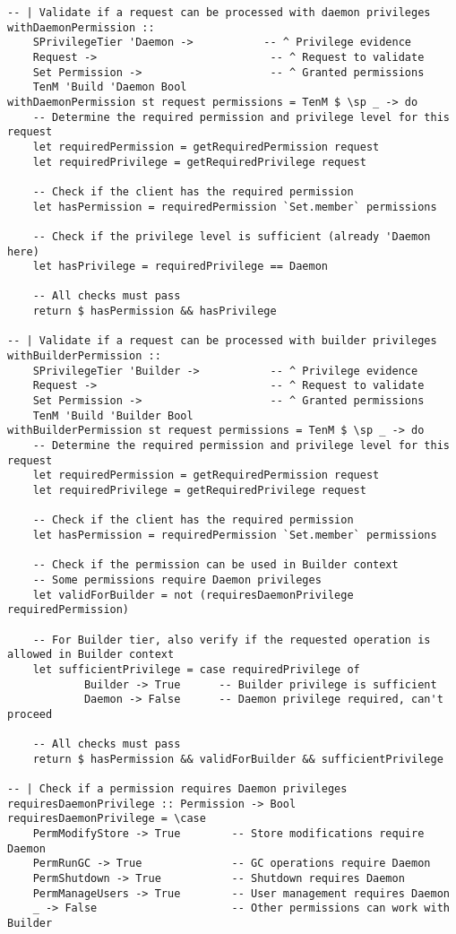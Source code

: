 \documentclass{article}
\begin{document}
\begin{tcolorbox}[title=Ten/Daemon/Server.hs Changes]
\begin{verbatim}
-- | Validate if a request can be processed with daemon privileges
withDaemonPermission ::
    SPrivilegeTier 'Daemon ->           -- ^ Privilege evidence
    Request ->                           -- ^ Request to validate
    Set Permission ->                    -- ^ Granted permissions
    TenM 'Build 'Daemon Bool
withDaemonPermission st request permissions = TenM $ \sp _ -> do
    -- Determine the required permission and privilege level for this request
    let requiredPermission = getRequiredPermission request
    let requiredPrivilege = getRequiredPrivilege request

    -- Check if the client has the required permission
    let hasPermission = requiredPermission `Set.member` permissions

    -- Check if the privilege level is sufficient (already 'Daemon here)
    let hasPrivilege = requiredPrivilege == Daemon

    -- All checks must pass
    return $ hasPermission && hasPrivilege

-- | Validate if a request can be processed with builder privileges
withBuilderPermission ::
    SPrivilegeTier 'Builder ->           -- ^ Privilege evidence
    Request ->                           -- ^ Request to validate
    Set Permission ->                    -- ^ Granted permissions
    TenM 'Build 'Builder Bool
withBuilderPermission st request permissions = TenM $ \sp _ -> do
    -- Determine the required permission and privilege level for this request
    let requiredPermission = getRequiredPermission request
    let requiredPrivilege = getRequiredPrivilege request

    -- Check if the client has the required permission
    let hasPermission = requiredPermission `Set.member` permissions

    -- Check if the permission can be used in Builder context
    -- Some permissions require Daemon privileges
    let validForBuilder = not (requiresDaemonPrivilege requiredPermission)

    -- For Builder tier, also verify if the requested operation is allowed in Builder context
    let sufficientPrivilege = case requiredPrivilege of
            Builder -> True      -- Builder privilege is sufficient
            Daemon -> False      -- Daemon privilege required, can't proceed

    -- All checks must pass
    return $ hasPermission && validForBuilder && sufficientPrivilege

-- | Check if a permission requires Daemon privileges
requiresDaemonPrivilege :: Permission -> Bool
requiresDaemonPrivilege = \case
    PermModifyStore -> True        -- Store modifications require Daemon
    PermRunGC -> True              -- GC operations require Daemon
    PermShutdown -> True           -- Shutdown requires Daemon
    PermManageUsers -> True        -- User management requires Daemon
    _ -> False                     -- Other permissions can work with Builder


\end{verbatim}
\end{tcolorbox}
\end{document}

